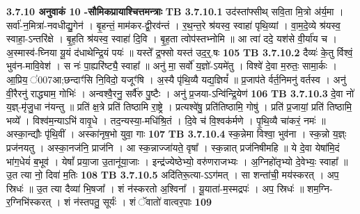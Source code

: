 \documentclass[17pt]{extarticle}
\begin{document}
{{{{{{{{{{{{{{{{{{{                \textbf{ 3.7.10    अनुवाकं   10 -सौमिकप्रायाश्चित्तमन्त्राः} \newline
                                \textbf{ TB 3.7.10.1} \newline
                  उद॑स्तांफ्सीथ् सवि॒ता मि॒त्रो अ॑र्य॒मा । सर्वा॑-न॒मित्रा॑-नवधीद्यु॒गेन॑ । बृ॒हन्तं॒ माम॑कर-द्वी॒रव॑न्तं । र॒थ॒न्त॒रे श्र॑यस्व॒ स्वाहा॑ पृथि॒व्यां । वा॒म॒दे॒व्ये श्र॑यस्व॒ स्वाहा॒-ऽन्तरि॑क्षे । बृ॒ह॒ति श्र॑यस्व॒ स्वाहा॑ दि॒वि । बृ॒ह॒ता त्वोप॑स्तभ्नोमि ॥ आ त्वा॑ ददे॒ यश॑से वी॒र्या॑य च । अ॒स्मास्व॑-घ्निया यू॒यं द॑धाथेन्द्रि॒यं पयः॑ ॥ यस्ते᳚ द्र॒फ्सो यस्त॑ उद॒र्॒.षः \textbf{ 105} \newline
                  \newline
                                \textbf{ TB 3.7.10.2} \newline
                  दैव्यः॑ के॒तु र्विश्वं॒ भुव॑न-मावि॒वेश॑ । स नः॑ पा॒ह्यरि॑ष्ट्यै॒ स्वाहा᳚ ॥ अनु॑ मा॒ सर्वो॑ य॒ज्ञो॑-ऽयमे॑तु । विश्वे॑ दे॒वा म॒रुतः॒ सामा॒र्कः । आ॒प्रिय॒ ॑007आ;छन्दाꣳ॑सि नि॒विदो॒ यजूꣳ॑षि । अ॒स्यै पृ॑थि॒व्यै यद्य॒ज्ञियं᳚ ॥ प्र॒जाप॑ते र्वर्त॒निमनु॑ वर्तस्व । अनु॑ वी॒रैरनु॑ राद्ध्याम॒ गोभिः॑ । अन्वश्वै॒रनु॒ सर्वै॑रु पु॒ष्टैः । अनु॑ प्र॒जया-ऽन्वि॑न्द्रि॒येण॑ \textbf{ 106} \newline
                  \newline
                                \textbf{ TB 3.7.10.3} \newline
                  दे॒वा नो॑ य॒ज्ञ्-मृ॑जु॒धा न॑यन्तु ॥ प्रति॑ क्ष॒त्रे प्रति॑ तिष्ठामि रा॒ष्ट्रे । प्रत्यश्वे॑षु॒ प्रति॑तिष्ठामि॒ गोषु॑ । प्रति॑ प्र॒जायां॒ प्रति॑ तिष्ठामि॒ भव्ये᳚ । विश्व॑म॒न्याऽभि॑ वावृ॒धे । तद॒न्यस्या॒-मधि॑श्रि॒तं । दि॒वे च॑ वि॒श्वक॑र्मणे । पृ॒थि॒व्यै चा॑करं॒ नमः॑ ॥ अस्का॒न्द्यौः पृ॑थि॒वीं । अस्का॑नृष॒भो युवा॒ गाः \textbf{ 107} \newline
                  \newline
                                \textbf{ TB 3.7.10.4} \newline
                  स्क॒न्नेमा विश्वा॒ भुव॑ना । स्क॒न्नो य॒ज्ञ्ः प्रज॑नयतु । अस्का॒नज॑नि॒ प्राज॑नि । आ स्क॒न्नाज्जा॑यते॒ वृषा᳚ । स्क॒न्नात् प्रज॑निषीमहि ॥ ये दे॒वा येषा॑मि॒दं भा॑ग॒धेयं॑ ब॒भूव॑ । येषां᳚ प्रया॒जा उ॒तानू॑या॒जाः । इन्द्र॑ज्येष्ठेभ्यो॒ वरु॑णराजभ्यः । अ॒ग्निहो॑तृभ्यो दे॒वेभ्यः॒ स्वाहा᳚ ॥ उ॒त त्या नो॒ दिवा॑ म॒तिः \textbf{ 108} \newline
                  \newline
                                \textbf{ TB 3.7.10.5} \newline
                  अदि॑तिरू॒त्या-ऽऽग॑मत् । सा शन्ता॑ची॒ मय॑स्करत् । अप॒ स्रिधः॑ ॥ उ॒त त्या दैव्या॑ भि॒षजा᳚ । शं न॑स्करतो अ॒श्विना᳚ । यू॒याता॑-म॒स्मद्रपः॑ । अप॒ स्रिधः॑ ॥ शम॒ग्नि-र॒ग्निभि॑स्करत् । शं न॑स्तपतु॒ सूर्यः॑ । शं ॅवातो॑ वात्वर॒पाः \textbf{ 109} \newline
}}}}}}}}}}}}}}}}}}}
\end{document}
